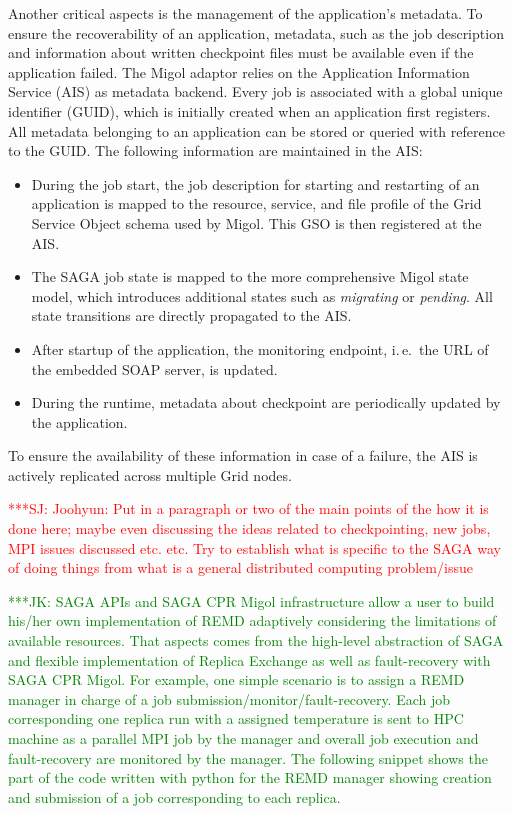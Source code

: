 \documentclass[times, 10pt,twocolumn]{article}
\newcommand{\kimnote}[1]{ {\textcolor{green} { ***JK: #1 }}}
\newcommand{\jhanote}[1]{ {\textcolor{red} { ***SJ: #1 }}}
\begin{document}
Another critical aspects is the management of the application's metadata. To ensure the recoverability of an application, metadata, such as the job description and information about written checkpoint files must be available even if the application failed. The Migol adaptor relies on the Application Information Service (AIS) as metadata backend. Every job is associated with a global unique identifier (GUID), which is initially created when an application first registers. All metadata belonging to an application can be stored or queried with reference to the GUID. The following information are maintained in the AIS:
\begin{itemize}
    \item During the job start, the job description for starting and restarting of an application is mapped to the resource, service, and file profile of the Grid Service Object schema used by Migol. This GSO is then registered at the AIS.
    \item The SAGA job state is mapped to the more comprehensive Migol state model, which introduces additional states such as \emph{migrating} or \emph{pending}. All state transitions are directly propagated to the AIS. 
    \item After startup of the application, the monitoring endpoint, i.\,e.\ the URL of the embedded SOAP server, is updated.
    \item During the runtime, metadata about checkpoint are periodically updated by the application.
\end{itemize}
To ensure the availability of these information in case of a failure, the AIS is actively replicated across multiple Grid nodes.

                                                  



\jhanote{Joohyun: Put in a paragraph or two of the main points of the
  how it is done here; maybe even discussing the ideas related to
  checkpointing, new jobs, MPI issues discussed etc. etc. Try to
  establish what is specific to the SAGA way of doing things from what
  is a general distributed computing problem/issue}

\kimnote{SAGA APIs and SAGA CPR Migol infrastructure allow a user to build his/her own implementation of REMD adaptively considering the limitations of available resources.  That aspects comes from the high-level abstraction of SAGA and flexible implementation of Replica Exchange as well as fault-recovery with SAGA CPR Migol.  For example, one simple scenario is to assign a REMD manager in charge of a job submission/monitor/fault-recovery.  Each job corresponding one replica run with a assigned temperature is sent to HPC machine as a parallel MPI job by the manager and overall job execution and fault-recovery are monitored by the manager.  The following snippet shows the part of the code written with python for the REMD manager showing creation and submission of a job corresponding to each replica.  }
\end{document}
